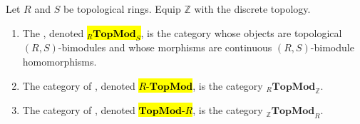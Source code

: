\begin{definition} \label{definition:categories_of_topological_modules_over_topological_rings}
Let $R$ and $S$ be topological rings. Equip $\mathbb{Z}$ with the discrete topology.
\begin{enumerate}
    \item The , denoted \hl{${}_{R}\mathbf{TopMod}_{S}$}, is the category whose objects are topological $(R, S)$-bimodules and whose morphisms are continuous $(R, S)$-bimodule homomorphisms.

    \item The category of , denoted \hl{$R\text{-}\mathbf{TopMod}$}, is the category ${}_{R}\mathbf{TopMod}_{\mathbb{Z}}$.

    \item The category of , denoted \hl{$\mathbf{TopMod}\text{-}R$}, is the category ${}_{\mathbb{Z}}\mathbf{TopMod}_{R}$.
\end{enumerate}

\end{definition}